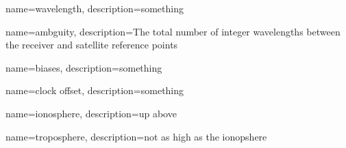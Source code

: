{
	name=wavelength,
	description={something}
}

{
	name=ambguity,
	description={The total number of integer wavelengths between the receiver and satellite reference points}
}

{
	name=biases,
	description={something}
}

{
	name=clock offset,
	description={something}
}

{
	name=ionosphere,
	description={up above}
}

{
	name=troposphere,
	description={not as high as the ionopshere}
}




